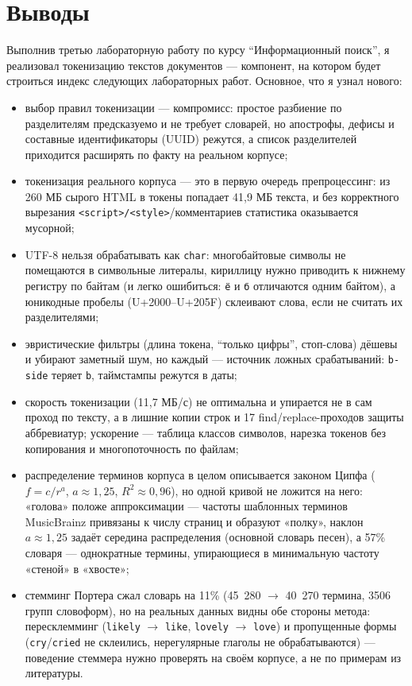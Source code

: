 \section{Выводы}
Выполнив третью лабораторную работу по курсу \enquote{Информационный поиск}, я
реализовал токенизацию текстов документов --- компонент, на котором будет
строиться индекс следующих лабораторных работ. Основное, что я узнал нового:

\begin{itemize}
    \item выбор правил токенизации --- компромисс: простое разбиение по
    разделителям предсказуемо и не требует словарей, но апострофы, дефисы и
    составные идентификаторы (UUID) режутся, а список разделителей приходится
    расширять по факту на реальном корпусе;
    \item токенизация реального корпуса --- это в первую очередь препроцессинг:
    из 260 МБ сырого HTML в токены попадает 41{,}9 МБ текста, и без корректного
    вырезания \texttt{<script>/<style>}/комментариев статистика оказывается
    мусорной;
    \item UTF-8 нельзя обрабатывать как \texttt{char}: многобайтовые символы не
    помещаются в символьные литералы, кириллицу нужно приводить к нижнему
    регистру по байтам (и легко ошибиться: \texttt{ё} и \texttt{б} отличаются
    одним байтом), а юникодные пробелы (U+2000--U+205F) склеивают слова, если
    не считать их разделителями;
    \item эвристические фильтры (длина токена, \enquote{только цифры}, стоп-слова)
    дёшевы и убирают заметный шум, но каждый --- источник ложных срабатываний:
    \texttt{b-side} теряет \texttt{b}, таймстампы режутся в даты;
    \item скорость токенизации (11{,}7 МБ/с) не оптимальна и упирается не в
    сам проход по тексту, а в лишние копии строк и 17 find/replace-проходов
    защиты аббревиатур; ускорение --- таблица классов символов, нарезка токенов
    без копирования и многопоточность по файлам;
    \item распределение терминов корпуса в целом описывается законом Ципфа
    ($f = c/r^{a}$, $a \approx 1{,}25$, $R^2 \approx 0{,}96$), но одной
    кривой не ложится на него: «голова» положе аппроксимации --- частоты
    шаблонных терминов MusicBrainz привязаны к числу страниц и образуют
    «полку», наклон $a \approx 1{,}25$ задаёт середина распределения
    (основной словарь песен), а 57\% словаря --- однократные термины,
    упирающиеся в минимальную частоту «стеной» в «хвосте»;
    \item стемминг Портера сжал словарь на 11\% (45~280 $\to$ 40~270 термина,
    3506 групп словоформ), но на реальных данных видны обе стороны метода:
    пересклемминг (\texttt{likely} $\to$ \texttt{like},
    \texttt{lovely} $\to$ \texttt{love}) и пропущенные формы
    (\texttt{cry}/\texttt{cried} не склеились, нерегулярные глаголы не
    обрабатываются) --- поведение стеммера нужно проверять на своём корпусе,
    а не по примерам из литературы.
\end{itemize}

